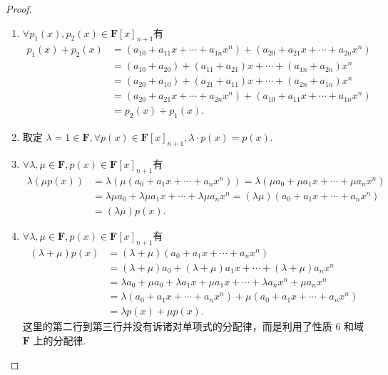 \begin{proof}
\begin{enumerate}
        \item $\forall p_1(x), p_2(x) \in \mathbf{F}[x]_{n+1}$有
            \begin{align*}
                p_1(x) + p_2(x)
                    & = (a_{10} + a_{11}x + \cdots + a_{1n}x^n) + (a_{20} + a_{21}x + \cdots + a_{2n}x^n) \\
                    & = (a_{10} + a_{20}) + (a_{11} + a_{21})x + \cdots + (a_{1n} + a_{2n})x^n            \\
                    & = (a_{20} + a_{10}) + (a_{21} + a_{11})x + \cdots + (a_{2n} + a_{1n})x^n            \\
                    & = (a_{20} + a_{21}x + \cdots + a_{2n}x^n) + (a_{10} + a_{11}x + \cdots + a_{1n}x^n) \\
                    & = p_2(x) + p_1(x).
            \end{align*}

        \item 取定 $\lambda = 1 \in \mathbf{F},\forall p(x) \in \mathbf{F}[x]_{n+1}, \lambda \cdot p(x) = p(x)$.

        \item $\forall \lambda, \mu \in \mathbf{F}, p(x) \in \mathbf{F}[x]_{n+1}$有
            \begin{align*}
                \lambda(\mu p(x)) & = \lambda(\mu(a_0 + a_1x + \cdots + a_nx^n)) = \lambda(\mu a_0 + \mu a_1x + \cdots + \mu a_nx^n)                  \\
                                    & = \lambda \mu a_0 + \lambda \mu a_1x + \cdots + \lambda \mu a_nx^n = (\lambda \mu) (a_0 + a_1x + \cdots + a_nx^n) \\
                                    & = (\lambda \mu)p(x).
            \end{align*}

        \item $\forall \lambda, \mu \in \mathbf{F}, p(x) \in \mathbf{F}[x]_{n+1}$有
            \begin{align*}
                (\lambda + \mu) p(x)
                    & = (\lambda + \mu)(a_0 + a_1x + \cdots + a_nx^n)                                         \\
                    & = (\lambda + \mu)a_0 + (\lambda + \mu)a_1x + \cdots + (\lambda + \mu)a_nx^n             \\
                    & = \lambda a_0 + \mu a_0 + \lambda a_1x + \mu a_1x+ \cdots + \lambda a_nx^n + \mu a_nx^n \\
                    & = \lambda(a_0 + a_1x + \cdots + a_nx^n) + \mu(a_0 + a_1x + \cdots + a_nx^n)             \\
                    & = \lambda p(x) + \mu p(x).
            \end{align*}
            这里的第二行到第三行并没有诉诸对单项式的分配律，而是利用了性质 6 和域 $\mathbf{F}$ 上的分配律.


\end{enumerate}
\end{proof}

